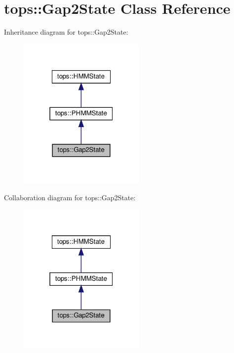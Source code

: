 \hypertarget{classtops_1_1Gap2State}{}\section{tops\+:\+:Gap2\+State Class Reference}
\label{classtops_1_1Gap2State}


Inheritance diagram for tops\+:\+:Gap2\+State\+:
\nopagebreak
\begin{figure}[H]
\begin{center}
\leavevmode
\includegraphics[width=175pt]{classtops_1_1Gap2State__inherit__graph}
\end{center}
\end{figure}


Collaboration diagram for tops\+:\+:Gap2\+State\+:
\nopagebreak
\begin{figure}[H]
\begin{center}
\leavevmode
\includegraphics[width=175pt]{classtops_1_1Gap2State__coll__graph}
\end{center}
\end{figure}
